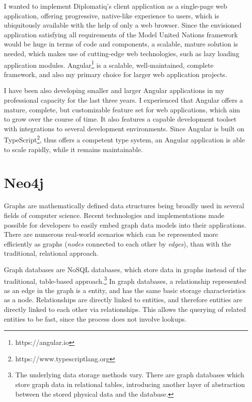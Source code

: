 I wanted to implement Diplomatiq's client application as a single-page web application, offering progressive, native-like experience to users, which is ubiquitously available with the help of only a web browser. Since the envisioned application satisfying all requirements of the Model United Nations framework would be huge in terms of code and components, a scalable, mature solution is needed, which makes use of cutting-edge web technologies, such as lazy loading application modules. Angular\footnote{https://angular.io} is a scalable, well-maintained, complete framework, and also my primary choice for larger web application projects.

I have been also developing smaller and larger Angular applications in my professional capacity for the last three years. I experienced that Angular offers a mature, complete, but customizable feature set for web applications, which aim to grow over the course of time. It also features a capable development toolset with integrations to several development environments. Since Angular is built on TypeScript\footnote{https://www.typescriptlang.org}, thus offers a competent type system, an Angular application is able to scale rapidly, while it remains maintainable.

\section{Neo4j}

Graphs are mathematically defined data structures being broadly used in several fields of computer science. Recent technologies and implementations made possible for developers to easily embed graph data models into their applications. There are numerous real-world scenarios which can be represented more efficiently as graphs (\emph{nodes} connected to each other by \emph{edges}), than with the traditional, relational approach.

Graph databases are NoSQL databases, which store data in graphs instead of the traditional, table-based approach.\footnote{The underlying data storage methods vary. There are graph databases which store graph data in relational tables, introducing another layer of abstraction between the stored physical data and the database.} In graph databases, a relationship represented as an edge in the graph is a  entity, and has the same basic storage characteristics as a node. Relationships are directly linked to entities, and therefore entities are directly linked to each other via relationships. This allows the querying of related entities to be fast, since the process does not involve lookups.


